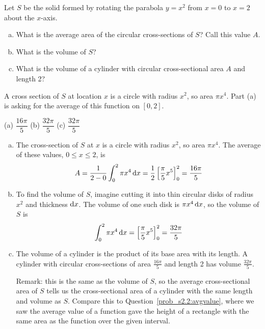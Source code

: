 

\begin{question}\label{prob_s2.2:avgarea}
Let $S$ be the solid formed by rotating the parabola $y=x^2$ from $x=0$ to $x=2$ about the $x$-axis.
\begin{enumerate}[(a)]
\item What is the average area of the circular cross-sections of $S$? Call this value $A$.
\item What is the volume of $S$?
\item What is the volume of a cylinder with circular cross-sectional area $A$ and length 2?
\end{enumerate}
\end{question}
\begin{hint}
A cross section of $S$ at location $x$ is a circle with radius $x^2$, so area $\pi x^4$. Part (a) is asking for the average of this function on $[0,2]$.
\end{hint}
\begin{answer}
(a) $\dfrac{16\pi}{5}$\qquad
(b) $\dfrac{32\pi}{5}$\qquad
(c) $\dfrac{32\pi}{5}$
\end{answer}
\begin{solution}
\begin{enumerate}[(a)]
\item The  cross-section of $S$ at $x$ is a circle with radius $x^2$, so area $\pi x^4$. The average of these values, $0 \leq x \leq 2$, is
\[A = \frac{1}{2-0}\int_0^2 \pi x^4\,\mathrm{d}x = \frac{1}{2}\left[\frac{\pi}{5}x^5\right]_0^2=\frac{16\pi}{5}\]
\item To find the volume of $S$, imagine cutting it into thin circular disks of radius $x^2$ and thickness $\mathrm{d}x$. The volume of one such disk is $\pi x^4\,\mathrm{d}x$, so the volume of $S$ is
\[\int_0^2 \pi x^4\,\mathrm{d}x = \left[\frac{\pi}{5}x^5\right]_0^2 = \frac{32\pi}{5} \]
\item The volume of a cylinder is the product of its base area with its length. A cylinder with circular cross-sections of area $\frac{16\pi}{5}$ and length 2 has volume $\frac{32\pi}{5}$.

Remark: this is the same as the volume of $S$, so the average cross-sectional area  of $S$ tells us the cross-sectional area of a cylinder with the same length and volume as $S$. Compare this to Question~\ref{prob_s2.2:avgvalue}, where we saw the average value of a function gave the height of a rectangle with the same area as the function over the given interval.
\end{enumerate}
\end{solution}

